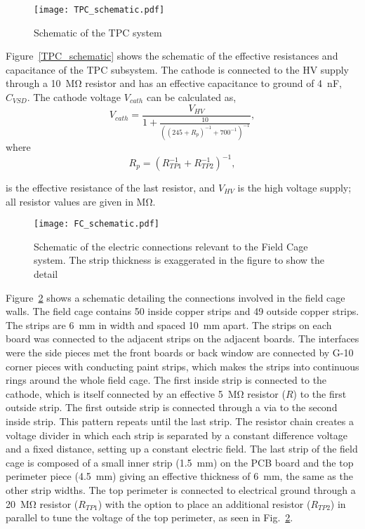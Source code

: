 \begin{figure}[!htb]
\centering
\texttt{[image: TPC\_schematic.pdf]}
\caption{Schematic of the TPC system}
\label{fig:TPC_schematic}
\end{figure}

Figure~\ref{TPC_schematic} shows the schematic of the effective resistances and capacitance of the TPC subsystem. The cathode is connected to the HV supply through a \SI{10}{\mega\ohm} resistor and has an effective capacitance to ground of \SI{4}{\nano\farad}, $C_{VSD}$. The cathode voltage $V_{cath}$ can be calculated as,
\begin{equation}
V_{cath} = \frac{V_{HV}}{ 1 + \frac{10}{ \left( (245 + R_p)^{-1} + 700^{-1} \right)^{-1} } },
\end{equation}
where 
\begin{equation}
R_p = \left( R_{TP1}^{-1} + R_{TP2}^{-1} \right)^{-1},
 \label{eq:Reff}
\end{equation} 

is the effective resistance of the last resistor, and $V_{HV}$ is the high voltage supply; all resistor values are given in \si{\mega\ohm}.


\begin{figure}[!htb]
\centering
\texttt{[image: FC\_schematic.pdf]}
\caption{Schematic of the electric connections relevant to the Field Cage system. The strip thickness is exaggerated in the figure to show the detail}
\label{fig:FC_schematic}
\end{figure}

Figure~\ref{fig:FC_schematic} shows a schematic detailing the connections involved in the field cage walls. The field cage contains 50 inside copper strips and 49 outside copper strips. The strips are \SI{6}{\milli\metre} in width and spaced \SI{10}{\milli\metre} apart. The strips on each board was connected to the adjacent strips on the adjacent boards. The interfaces were the side pieces met the front boards or back window are connected by G-10 corner pieces with conducting paint strips, which makes the strips into continuous rings around the whole field cage. The first inside strip is connected to the cathode, which is itself connected by an effective \SI{5}{\mega\ohm} resistor ($R$) to the first outside strip. The first outside strip is connected through a via to the second inside strip. This pattern repeats until the last strip. The resistor chain creates a voltage divider in which each strip is separated by a constant difference voltage and a fixed distance, setting up a constant electric field. The last strip of the field cage is composed of a small inner strip  (\SI{1.5}{\milli\metre}) on the PCB board and the top perimeter piece (\SI{4.5}{\milli\metre}) giving an  effective thickness of \SI{6}{\milli\metre}, the same as the other strip widths. The top perimeter is connected to electrical ground through a \SI{20}{\mega\ohm} resistor ($R_{TP1}$) with the option to place an additional resistor ($R_{TP2}$) in parallel to tune the voltage of the top perimeter, as seen in Fig.~\ref{fig:FC_schematic}. 

